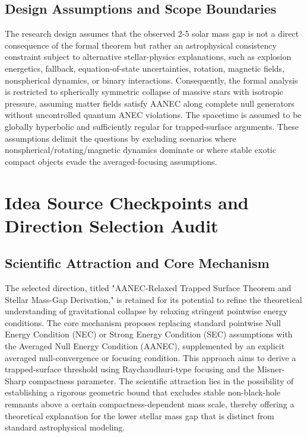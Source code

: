 \documentclass[conference]{IEEEtran}
\begin{document}
\subsection{Design Assumptions and Scope Boundaries}
The research design assumes that the observed 2-5 solar mass gap is not a direct consequence of the formal theorem but rather an astrophysical consistency constraint subject to alternative stellar-physics explanations, such as explosion energetics, fallback, equation-of-state uncertainties, rotation, magnetic fields, nonspherical dynamics, or binary interactions. Consequently, the formal analysis is restricted to spherically symmetric collapse of massive stars with isotropic pressure, assuming matter fields satisfy AANEC along complete null generators without uncontrolled quantum ANEC violations. The spacetime is assumed to be globally hyperbolic and sufficiently regular for trapped-surface arguments. These assumptions delimit the questions by excluding scenarios where nonspherical/rotating/magnetic dynamics dominate or where stable exotic compact objects evade the averaged-focusing assumptions.

\section{Idea Source Checkpoints and Direction Selection Audit}
\subsection{Scientific Attraction and Core Mechanism}
The selected direction, titled "AANEC-Relaxed Trapped Surface Theorem and Stellar Mass-Gap Derivation," is retained for its potential to refine the theoretical understanding of gravitational collapse by relaxing stringent pointwise energy conditions. The core mechanism proposes replacing standard pointwise Null Energy Condition (NEC) or Strong Energy Condition (SEC) assumptions with the Averaged Null Energy Condition (AANEC), supplemented by an explicit averaged null-convergence or focusing condition. This approach aims to derive a trapped-surface threshold using Raychaudhuri-type focusing and the Misner-Sharp compactness parameter. The scientific attraction lies in the possibility of establishing a rigorous geometric bound that excludes stable non-black-hole remnants above a certain compactness-dependent mass scale, thereby offering a theoretical explanation for the lower stellar mass gap that is distinct from standard astrophysical modeling.
\end{document}
